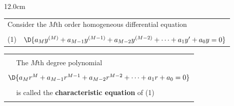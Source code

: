 %
%
%
%
%


\begin{frame}
\begin{columns}\begin{column}{12.0cm}
\scriptsize

\vspace{0.1cm}


\begin{center}
{%
\begin{tabular}{p{0.4cm}p{10.9cm}}
	\multicolumn{2}{l}{Consider the $M$th order homogeneous differential equation} \\
	&\\
	(1) & \multicolumn{1}{c}{$\D{a_{M}y^{(M)} + a_{M-1}y^{(M-1)} + a_{M-2}y^{(M-2)} + \dots + a_{1}y' + a_0 y = 0}$}\\
\end{tabular}}
\end{center}

\begin{center}
{%
\begin{tabular}{|p{0.4cm}p{10.9cm}|}
	\hline
	\hline
	&\\
	\DEF & The $M$th degree polynomial \\
	&\\
	\multicolumn{2}{|c|}{$\D{a_{M}r^{M} + a_{M-1}r^{M-1} + a_{M-2}r^{M-2} + \dots + a_{1}r + a_0 = 0}$}\\
	&\\
	& is called the {\bf characteristic equation} of (1) \\
	&\\
	\hline
	\hline
\end{tabular}}
\end{center}


\end{column}
\end{columns}
\end{frame}
